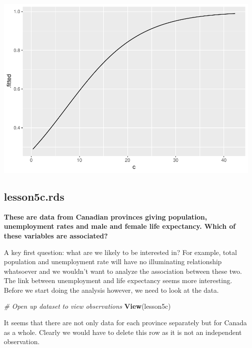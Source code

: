 \documentclass[]{book}
\newenvironment{Shaded}{\begin{snugshade}}{\end{snugshade}}
\newcommand{\CommentTok}[1]{\textcolor[rgb]{0.56,0.35,0.01}{\textit{#1}}}
\newcommand{\KeywordTok}[1]{\textcolor[rgb]{0.13,0.29,0.53}{\textbf{#1}}}
\newcommand{\NormalTok}[1]{#1}
\newcommand{\OperatorTok}[1]{\textcolor[rgb]{0.81,0.36,0.00}{\textbf{#1}}}
\newcommand{\StringTok}[1]{\textcolor[rgb]{0.31,0.60,0.02}{#1}}
\begin{document}
\includegraphics{09-answers_files/figure-latex/week5n-1.pdf}

\hypertarget{lesson5c.rds}{%
\subsection{lesson5c.rds}\label{lesson5c.rds}}

\textbf{These are data from Canadian provinces giving population, unemployment rates and male and female life expectancy. Which of these variables are associated?}

A key first question: what are we likely to be interested in? For example, total population and unemployment rate will have no illuminating relationship whatsoever and we wouldn't want to analyze the association between these two. The link between unemployment and life expectancy seems more interesting. Before we start doing the analysis however, we need to look at the data.

\begin{Shaded}
\begin{Highlighting}[]
\CommentTok{# Open up dataset to view observations}
\KeywordTok{View}\NormalTok{(lesson5c)}
\end{Highlighting}
\end{Shaded}

It seems that there are not only data for each province separately but for Canada as a whole. Clearly we would have to delete this row as it is not an independent observation.

\begin{Shaded}
\end{Shaded}
\end{document}
